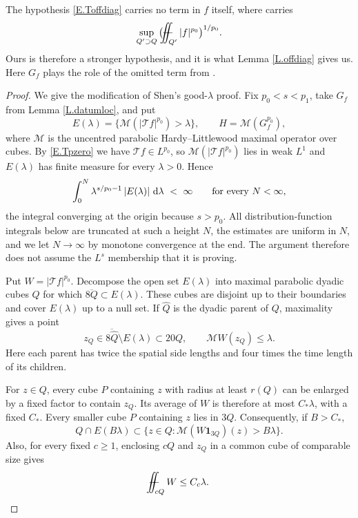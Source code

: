 \documentclass[12pt,leqno]{amsart}
\numberwithin{equation}{section}
\newcommand{\abs}[1]{\left\vert#1\right\vert}
\renewcommand{\d}{\,\mathrm d}
\def\Yint#1{\mathchoice
	{\YYint\displaystyle\textstyle{#1}}%
	{\YYint\textstyle\scriptstyle{#1}}%
	{\YYint\scriptstyle\scriptscriptstyle{#1}}%
	{\YYint\scriptscriptstyle\scriptscriptstyle{#1}}%
	\!\dint}
\newcommand{\dint}{\int\!\!\!\!\!\int}
\def\YYint#1#2#3{{\setbox0=\hbox{$#1{#2#3}{\iint}$}
		\vcenter{\hbox{$#2#3$}}\kern-.51\wd0}}
\def\longdash{\mkern-1.5mu{-}\mkern-7.5mu{-}}
\def\fiint{\Yint\longdash}
\theoremstyle{plain}
\theoremstyle{remark}
\begin{document}
\noindent The hypothesis \eqref{E.Toffdiag} carries no term in $f$ itself,
where \cite[(3.2)]{Shen} carries
\[
 \sup_{Q'\supset Q}\big(\fiint_{Q'}|f|^{p_0}\big)^{1/p_0}.
\]
Ours is therefore a stronger hypothesis, and it is what Lemma
\ref{L.offdiag} gives us. Here $G_f$ plays the role of the omitted term from
\cite{Shen}.

\begin{proof}
We give the modification of Shen's good-$\lambda$ proof. Fix
$p_0<s<p_1$, take $G_f$ from Lemma \ref{L.datumloc}, and put
\[
 E(\lambda)=\{\mathcal M(|\mathcal Tf|^{p_0})>\lambda\},\qquad
 H=\mathcal M(G_f^{p_0}),
\]
where $\mathcal M$ is the uncentred parabolic Hardy--Littlewood maximal
operator over cubes.
By \eqref{E.Tpzero} we have $\mathcal Tf\in L^{p_0}$, so
$\mathcal M(|\mathcal Tf|^{p_0})$ lies in weak $L^1$ and $E(\lambda)$ has
finite measure for every $\lambda>0$. Hence
\[
 \int_0^N\lambda^{s/p_0-1}\abs{E(\lambda)}\d\lambda\ <\ \infty
 \qquad\hbox{for every }N<\infty ,
\]
the integral converging at the origin because $s>p_0$. All
distribution-function integrals below are truncated at such a height $N$, the
estimates are uniform in $N$, and we let $N\to\infty$ by monotone convergence
at the end. The argument therefore does not assume the $L^s$ membership that
it is proving.

Put $W=|\mathcal Tf|^{p_0}$. Decompose the open set $E(\lambda)$ into
maximal parabolic dyadic cubes $Q$ for which
$\overline{8Q}\subset E(\lambda)$. These cubes are disjoint up to their
boundaries and cover $E(\lambda)$ up to a null set. If $\widehat Q$ is
the dyadic parent of $Q$, maximality gives a point
\[
 z_Q\in\overline{8\widehat Q}\setminus E(\lambda)
 \subset20Q,\qquad \mathcal M W(z_Q)\le\lambda.
\]
Here each parent has twice the spatial side lengths and four times
the time length of its children.

For $z\in Q$, every cube $P$ containing $z$ with radius at least $r(Q)$
can be enlarged by a fixed factor to contain $z_Q$. Its average of $W$
is therefore at most $C_*\lambda$, with a fixed $C_*$. Every smaller
cube $P$ containing $z$ lies in $3Q$. Consequently, if $B>C_*$,
\begin{equation}\label{E.maxlocalised}
 Q\cap E(B\lambda)
 \subset\{z\in Q:\mathcal M(W\mathbf1_{3Q})(z)>B\lambda\}.
\end{equation}
Also, for every fixed $c\ge1$, enclosing $cQ$ and $z_Q$ in a common
cube of comparable size gives
\begin{equation}\label{E.whitneyaverage}
 \fiint_{cQ}W\le C_c\lambda.
\end{equation}


\end{proof}
\end{document}
